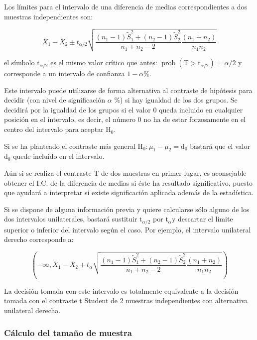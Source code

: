 \documentclass[
]{article}
\begin{document}
Los límites para el intervalo de una diferencia de medias correspondientes a dos muestras independientes son:

\[
\bar{X}_{1}-\bar{X}_{2} \pm t_{\alpha / 2} \sqrt{\frac{\left(n_{1}-1\right) \widetilde{S}_{1}^{2}+\left(n_{2}-1\right) \widetilde{S}_{2}^{2}}{n_{1}+n_{2}-2} \frac{\left(n_{1}+n_{2}\right)}{n_{1} n_{2}}}
\]

el símbolo \(\mathrm{t}_{\alpha / 2}\) es el mismo valor crítico que antes: \(\operatorname{prob}\left(\mathrm{T}>\mathrm{t}_{\alpha / 2}\right)=\alpha / 2\) y corresponde a un intervalo de confianza \(1-\alpha \%\).

Este intervalo puede utilizarse de forma alternativa al contraste de hipótesis para decidir (con nivel de significación \(\alpha\) \%) si hay igualdad de los dos grupos. Se decidirá por la igualdad de los grupos si el valor 0 queda incluido en cualquier posición en el intervalo, es decir, el número 0 no ha de estar forzosamente en el centro del intervalo para aceptar \(\mathrm{H}_{0}\).

Si se ha planteado el contraste más general \(\mathrm{H}_{0}: \mu_{1}-\mu_{2}=\mathrm{d}_{0}\) bastará que el valor \(\mathrm{d}_{0}\) quede incluido en el intervalo.

Aún si se realiza el contraste T de dos muestras en primer lugar, es aconsejable obtener el I.C. de la diferencia de medias si éste ha resultado significativo, puesto que ayudará a interpretar si existe significación aplicada además de la estadística.

Si se dispone de alguna información previa y quiere calcularse sólo alguno de los dos intervalos unilaterales, bastará sustituir \(\mathrm{t}_{\alpha / 2}\) por \(\mathrm{t}_{\alpha} \mathrm{y}\) descartar el límite superior o inferior del intervalo según el caso. Por ejemplo, el intervalo unilateral derecho corresponde a:

\[
\left(-\infty, \bar{X}_{1}-\bar{X}_{2}+t_{\alpha} \sqrt{\frac{\left(n_{1}-1\right) \widetilde{S}_{1}^{2}+\left(n_{2}-1\right) \widetilde{S}_{2}^{2}}{n_{1}+n_{2}-2} \frac{\left(n_{1}+n_{2}\right)}{n_{1} n_{2}}}\right)
\]

La decisión tomada con este intervalo es totalmente equivalente a la decisión tomada con el contraste t Student de 2 muestras independientes con alternativa unilateral derecha.

\subsubsection{Cálculo del tamaño de muestra}\label{cuxe1lculo-del-tamauxf1o-de-muestra}
\end{document}
